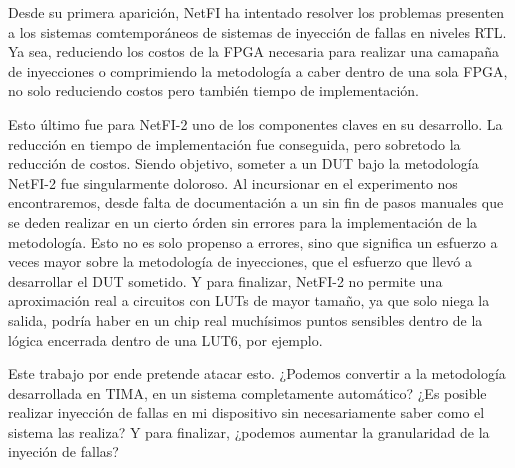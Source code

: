 Desde su primera aparición, NetFI ha intentado resolver los problemas presenten a los sistemas comtemporáneos de sistemas de inyección de fallas en niveles RTL. Ya sea, reduciendo los costos de la FPGA necesaria para realizar una camapaña de inyecciones o comprimiendo la metodología a caber dentro de una sola FPGA, no solo reduciendo costos pero también tiempo de implementación.

Esto último fue para NetFI-2 uno de los componentes claves en su desarrollo. La reducción en tiempo de implementación fue conseguida, pero sobretodo la reducción de costos. Siendo objetivo, someter a un DUT bajo la metodología NetFI-2 fue singularmente doloroso. Al incursionar en el experimento nos encontraremos, desde falta de documentación a un sin fin de pasos manuales que se deden realizar en un cierto órden sin errores para la implementación de la metodología. Esto no es solo propenso a errores, sino que significa un esfuerzo a veces mayor sobre la metodología de inyecciones, que el esfuerzo que llevó a desarrollar el DUT sometido. Y para finalizar, NetFI-2 no permite una aproximación real a circuitos con LUTs de mayor tamaño, ya que solo niega la salida, podría haber en un chip real muchísimos puntos sensibles dentro de la lógica encerrada dentro de una LUT6, por ejemplo.

Este trabajo por ende pretende atacar esto. ¿Podemos convertir a la metodología desarrollada en TIMA, en un sistema completamente automático? ¿Es posible realizar inyección de fallas en mi dispositivo sin necesariamente saber como el sistema las realiza? Y para finalizar, ¿podemos aumentar la granularidad de la inyeción de fallas?
